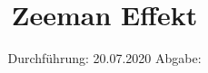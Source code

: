 

\subject{V 27}
\title{Zeeman Effekt}
\date{%
  Durchführung: 20.07.2020
  \hspace{3em}
  Abgabe: 
}



\maketitle
\thispagestyle{empty}
\tableofcontents
\newpage







\printbibliography{}


